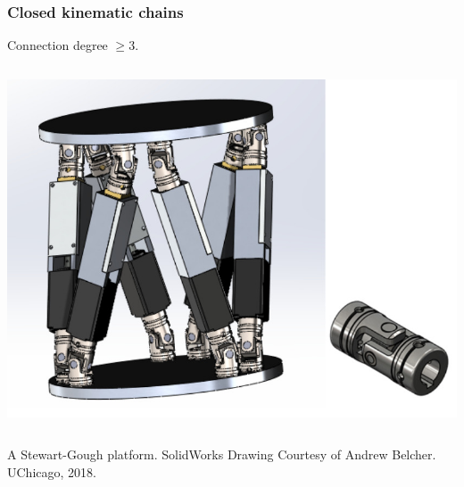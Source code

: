 \begin{frame}
	\frametitle{Closed kinematic chains}
	\footnotesize{Connection degree $\ge 3$.}
	\newline
		\begin{columns}[b]
			\begin{column}{.74\columnwidth}			
				\begin{tcolorbox}[colframe=blue!80!green, coltitle=white!80,toggle enlargement=none]
					\centering 
					\includegraphics[width=\textwidth]{figures/stewart.jpg}
				\end{tcolorbox}
			\end{column}	
		\end{columns}
		\centering \footnotesize{A Stewart-Gough platform. SolidWorks Drawing Courtesy of Andrew Belcher. UChicago, 2018.}
\end{frame}

